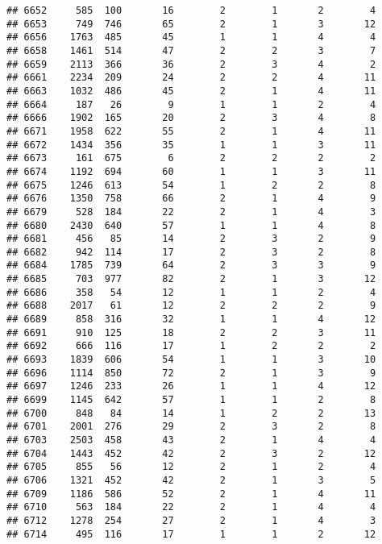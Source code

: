 \documentclass[]{article}
\begin{document}
\begin{verbatim}
## 6652     585  100       16        2        1       2        4
## 6653     749  746       65        2        1       3       12
## 6656    1763  485       45        1        1       4        4
## 6658    1461  514       47        2        2       3        7
## 6659    2113  366       36        2        3       4        2
## 6661    2234  209       24        2        2       4       11
## 6663    1032  486       45        2        1       4       11
## 6664     187   26        9        1        1       2        4
## 6666    1902  165       20        2        3       4        8
## 6671    1958  622       55        2        1       4       11
## 6672    1434  356       35        1        1       3       11
## 6673     161  675        6        2        2       2        2
## 6674    1192  694       60        1        1       3       11
## 6675    1246  613       54        1        2       2        8
## 6676    1350  758       66        2        1       4        9
## 6679     528  184       22        2        1       4        3
## 6680    2430  640       57        1        1       4        8
## 6681     456   85       14        2        3       2        9
## 6682     942  114       17        2        3       2        8
## 6684    1785  739       64        2        3       3        9
## 6685     703  977       82        2        1       3       12
## 6686     358   54       12        1        1       2        4
## 6688    2017   61       12        2        2       2        9
## 6689     858  316       32        1        1       4       12
## 6691     910  125       18        2        2       3       11
## 6692     666  116       17        1        2       2        2
## 6693    1839  606       54        1        1       3       10
## 6696    1114  850       72        2        1       3        9
## 6697    1246  233       26        1        1       4       12
## 6699    1145  642       57        1        1       2        8
## 6700     848   84       14        1        2       2       13
## 6701    2001  276       29        2        3       2        8
## 6703    2503  458       43        2        1       4        4
## 6704    1443  452       42        2        3       2       12
## 6705     855   56       12        2        1       2        4
## 6706    1321  452       42        2        1       3        5
## 6709    1186  586       52        2        1       4       11
## 6710     563  184       22        2        1       4        4
## 6712    1278  254       27        2        1       4        3
## 6714     495  116       17        1        1       2       12

\end{verbatim}
\end{document}
